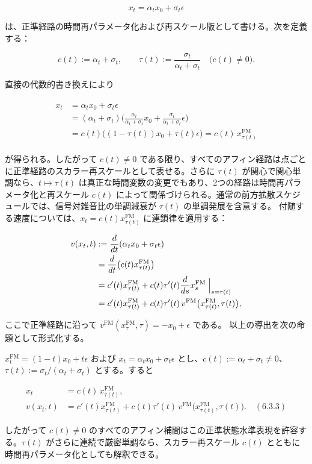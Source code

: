 \[
x_t=\alpha_t x_0+\sigma_t\epsilon
\]


は、正準経路の時間再パラメータ化および再スケール版として書ける。次を定義する：

\[
c(t):=\alpha_t+\sigma_t,\qquad
\tau(t):=\frac{\sigma_t}{\alpha_t+\sigma_t}\quad\bigl(c(t)\neq 0\bigr).
\]


直接の代数的書き換えにより

\begin{align*}
\begin{aligned}
x_t&=\alpha_t x_0+\sigma_t\epsilon \\
&=(\alpha_t+\sigma_t)\Biggl(\frac{\alpha_t}{\alpha_t+\sigma_t}x_0+\frac{\sigma_t}{\alpha_t+\sigma_t}\epsilon\Biggr) \\
&=c(t)\bigl((1-\tau(t))x_0+\tau(t)\epsilon\bigr)=c(t)\,x_{\tau(t)}^{\mathrm{FM}}
\end{aligned}
\end{align*}


が得られる。したがって $c(t)\neq 0$ である限り、すべてのアフィン経路は点ごとに正準経路のスカラー再スケールとして表せる。さらに $\tau(t)$ が関心で関心単調なら、$t\mapsto\tau(t)$ は真正な時間変数の変更でもあり、2つの経路は時間再パラメータ化と再スケール $c(t)$ によって関係づけられる。通常の前方拡散スケジュールでは、信号対雑音比の単調減衰が $\tau(t)$ の単調発展を含意する。
付随する速度については、$x_t=c(t)x_{\tau(t)}^{\mathrm{FM}}$ に連鎖律を適用する：

\begin{align*}
\begin{aligned}
v(x_t,t)&:=\frac{d}{dt}(\alpha_t x_0+\sigma_t\epsilon) \\
&=\frac{d}{dt}\bigl(c(t)x_{\tau(t)}^{\mathrm{FM}}\bigr) \\
&=c'(t)x_{\tau(t)}^{\mathrm{FM}}+c(t)\tau'(t)\frac{d}{ds}x_s^{\mathrm{FM}}\Bigm|_{s=\tau(t)} \\
&=c'(t)x_{\tau(t)}^{\mathrm{FM}}+c(t)\tau'(t)\,v^{\mathrm{FM}}\bigl(x_{\tau(t)}^{\mathrm{FM}},\tau(t)\bigr),
\end{aligned}
\end{align*}


ここで正準経路に沿って $v^{\mathrm{FM}}(x_{\tau}^{\mathrm{FM}},\tau)=-x_0+\epsilon$ である。
以上の導出を次の命題として形式化する。

\begin{propositionbox}[命題 6.3.3（アフィンフローの同値性）]
$x_t^{\mathrm{FM}}=(1-t)x_0+t\epsilon$ および $x_t=\alpha_t x_0+\sigma_t\epsilon$ とし、$c(t):=\alpha_t+\sigma_t\neq 0$、$\tau(t):=\sigma_t/(\alpha_t+\sigma_t)$ とする。すると

\[
\begin{aligned}
x_t&=c(t)\,x_{\tau(t)}^{\mathrm{FM}}, \\
v(x_t,t)&=c'(t)x_{\tau(t)}^{\mathrm{FM}}+c(t)\tau'(t)\,v^{\mathrm{FM}}\bigl(x_{\tau(t)}^{\mathrm{FM}},\tau(t)\bigr). \quad (6.3.3)
\end{aligned}
\]

したがって $c(t)\neq 0$ のすべてのアフィン補間はこの正準状態水準表現を許容する。$\tau(t)$ がさらに連続で厳密単調なら、スカラー再スケール $c(t)$ とともに時間再パラメータ化としても解釈できる。
\end{propositionbox}


